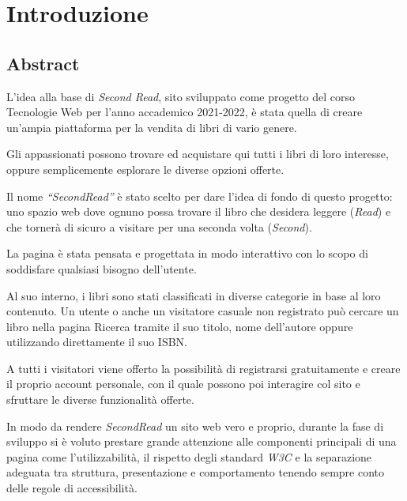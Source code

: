 \section{Introduzione}\label{sec:intro}

\subsection{Abstract}
L’idea alla base di \textit{Second Read}, sito sviluppato come progetto del corso Tecnologie Web per l’anno accademico 2021-2022, è stata quella di creare un’ampia piattaforma per la vendita di libri di vario genere.

Gli appassionati possono trovare ed acquistare qui tutti i libri di loro interesse, oppure semplicemente esplorare le diverse opzioni offerte.

Il nome \textit{“SecondRead”} è stato scelto per dare l’idea di fondo di questo progetto: uno spazio web dove ognuno possa trovare il libro che desidera leggere (\textit{Read}) e che tornerà di sicuro a visitare per una seconda volta (\textit{Second}).

La pagina è stata pensata e progettata in modo interattivo con lo scopo di soddisfare qualsiasi bisogno dell'utente.

Al suo interno, i libri sono stati classificati in diverse categorie in base al loro contenuto. Un utente o anche un visitatore casuale non registrato può cercare un libro nella pagina Ricerca tramite il suo titolo, nome dell'autore oppure utilizzando direttamente il suo ISBN.

A tutti i visitatori viene offerto la possibilità di registrarsi gratuitamente e creare il proprio account personale, con il quale possono poi interagire col sito e sfruttare le diverse funzionalità offerte.

In modo da rendere \textit{SecondRead} un sito web vero e proprio, durante la fase di sviluppo si è voluto prestare grande attenzione alle componenti principali di una pagina come l'utilizzabilità, il rispetto degli standard \textit{W3C} e la separazione adeguata tra struttura, presentazione e comportamento tenendo sempre conto delle regole di accessibilità.